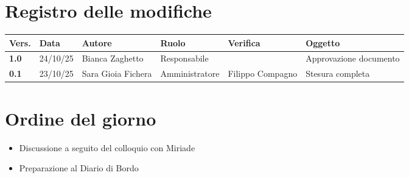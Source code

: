 \documentclass[a4paper,12pt]{article}
\begin{document}


\newpage
\section*{Registro delle modifiche}

\begin{table}[h!]
\begin{tabularx}{\textwidth}{|l|l|l|l|L|L|}
\hline
\textbf{Vers.} & \textbf{Data} & \textbf{Autore} & \textbf{Ruolo} & \textbf{Verifica} & \textbf{Oggetto} \\
\hline
\textbf{1.0} & 24/10/25 & Bianca Zaghetto & Responsabile &  & Approvazione documento \\
\textbf{0.1} & 23/10/25 & Sara Gioia Fichera & Amministratore & Filippo Compagno & Stesura completa \\
\hline
\end{tabularx}
\end{table}

\newpage
\tableofcontents
\newpage

\markright{}
\newpage
\section{Ordine del giorno}

\begin{itemize}
    \item Discussione a seguito del colloquio con Miriade
    \item Preparazione al Diario di Bordo
\end{itemize}
\end{document}
